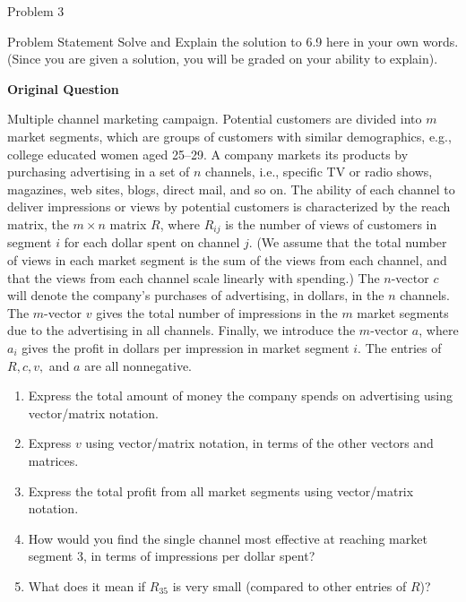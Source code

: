 \begin{problem}{Problem 3}
    \begin{statement}{Problem Statement}
        Solve and Explain the solution to 6.9  here in your own words. (Since you are given a solution, you will be graded on your ability to explain). \vspace*{1em}

        \noindent \textbf{Original Question} \vspace*{1em}

        Multiple channel marketing campaign. Potential customers are divided into $m$ market segments, which are groups of customers with similar demographics, e.g., college educated women aged 25–29. 
        A company markets its products by purchasing advertising in a set of $n$ channels, i.e., specific TV or radio shows, magazines, web sites, blogs, direct mail, and so on. The ability of each 
        channel to deliver impressions or views by potential customers is characterized by the reach matrix, the $m \times n$ matrix $R$, where $R_{ij}$ is the number of views of customers in segment $i$ 
        for each dollar spent on channel $j$. (We assume that the total number of views in each market segment is the sum of the views from each channel, and that the views from each channel scale 
        linearly with spending.) The $n$-vector $c$ will denote the company's purchases of advertising, in dollars, in the $n$ channels. The $m$-vector $v$ gives the total number of impressions in the 
        $m$ market segments due to the advertising in all channels. Finally, we introduce the $m$-vector $a$, where $a_{i}$ gives the profit in dollars per impression in market segment $i$. The entries 
        of $R, c, v,$ and $a$ are all nonnegative.

        \begin{enumerate}[label = (\alph*)]
            \item Express the total amount of money the company spends on advertising using vector/matrix notation.
            \item Express $v$ using vector/matrix notation, in terms of the other vectors and matrices.
            \item Express the total profit from all market segments using vector/matrix notation.
            \item How would you find the single channel most effective at reaching market segment 3, in terms of impressions per dollar spent?
            \item What does it mean if $R_{35}$ is very small (compared to other entries of $R$)?
        \end{enumerate}
    \end{statement}


\end{problem}
